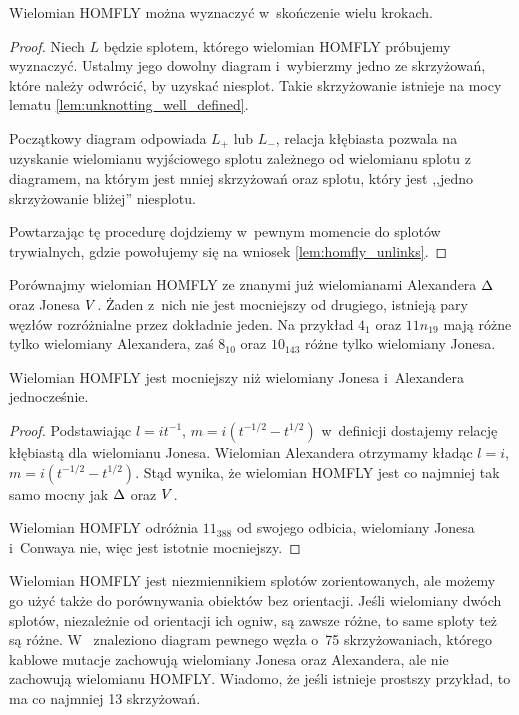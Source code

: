 \begin{proposition}
    Wielomian HOMFLY można wyznaczyć w~skończenie wielu krokach.
\end{proposition}

\begin{proof}
    Niech $L$ będzie splotem, którego wielomian HOMFLY próbujemy wyznaczyć.
    Ustalmy jego dowolny diagram i~wybierzmy jedno ze skrzyżowań, które należy odwrócić, by uzyskać niesplot.
    Takie skrzyżowanie istnieje na mocy lematu \ref{lem:unknotting_well_defined}.

    Początkowy diagram odpowiada $L_+$ lub $L_-$, relacja kłębiasta pozwala na uzyskanie wielomianu wyjściowego splotu zależnego od wielomianu splotu z
    diagramem, na którym jest mniej skrzyżowań oraz splotu, który jest ,,jedno skrzyżowanie bliżej'' niesplotu.

    Powtarzając tę procedurę dojdziemy w~pewnym momencie do splotów trywialnych, gdzie powołujemy się na wniosek \ref{lem:homfly_unlinks}.
\end{proof}

Porównajmy wielomian HOMFLY ze znanymi już wielomianami Alexandera $\Delta$ oraz Jonesa $V$.
Żaden z~nich nie jest mocniejszy od drugiego, istnieją pary węzłów rozróżnialne przez dokładnie jeden.
Na przykład $4_1$ oraz $11n_{19}$ mają różne tylko wielomiany Alexandera, zaś $8_{10}$ oraz $10_{143}$ różne tylko wielomiany Jonesa.

\begin{proposition}
\label{homfly_stronger}
    Wielomian HOMFLY jest mocniejszy niż wielomiany Jonesa i~Alexandera jednocześnie.
\end{proposition}

\begin{proof}
    Podstawiając $l = it^{-1}$, $m = i(t^{-1/2} - t^{1/2})$ w~definicji dostajemy relację kłębiastą dla wielomianu Jonesa.
    Wielomian Alexandera otrzymamy kładąc $l = i$, $m = i(t^{-1/2} - t^{1/2})$.
    Stąd wynika, że wielomian HOMFLY jest co najmniej tak samo mocny jak $\Delta$ oraz $V$.

    Wielomian HOMFLY odróżnia $11_{388}$ od swojego odbicia, wielomiany Jonesa i~Conwaya nie, więc jest istotnie mocniejszy.
\end{proof}

Wielomian HOMFLY jest niezmiennikiem splotów zorientowanych, ale możemy go użyć także do porównywania obiektów bez orientacji.
Jeśli wielomiany dwóch splotów, niezależnie od orientacji ich ogniw, są zawsze różne, to same sploty też są różne.
W~\cite{dunfield10} znaleziono diagram pewnego węzła o~75 skrzyżowaniach, którego kablowe mutacje zachowują wielomiany Jonesa oraz Alexandera, ale nie zachowują wielomianu HOMFLY.
Wiadomo, że jeśli istnieje prostszy przykład, to ma co najmniej 13 skrzyżowań.

